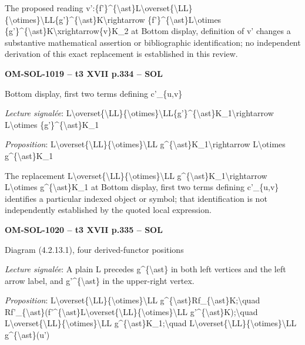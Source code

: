 The proposed reading v':\{f'\}\textasciicircum{}\{\textbackslash{}ast\}L\textbackslash{}overset\{\textbackslash{}LL\}\{\textbackslash{}otimes\}\textbackslash{}LL\{g'\}\textasciicircum{}\{\textbackslash{}ast\}K\textbackslash{}rightarrow \{f'\}\textasciicircum{}\{\textbackslash{}ast\}L\textbackslash{}otimes \{g'\}\textasciicircum{}\{\textbackslash{}ast\}K\textbackslash{}xrightarrow\{v\}K\_2 at Bottom display, definition of v' changes a substantive mathematical assertion or bibliographic identification; no independent derivation of this exact replacement is established in this review.\par
\par\noindent\textbf{OM-SOL-1019 -- t3 XVII p.334 -- SOL}\par
Bottom display, first two terms defining c'\_\{u,v\}\par
\emph{Lecture signalée}: L\textbackslash{}overset\{\textbackslash{}LL\}\{\textbackslash{}otimes\}\textbackslash{}LL\{g'\}\textasciicircum{}\{\textbackslash{}ast\}K\_1\textbackslash{}rightarrow L\textbackslash{}otimes \{g'\}\textasciicircum{}\{\textbackslash{}ast\}K\_1\par
\emph{Proposition}: L\textbackslash{}overset\{\textbackslash{}LL\}\{\textbackslash{}otimes\}\textbackslash{}LL g\textasciicircum{}\{\textbackslash{}ast\}K\_1\textbackslash{}rightarrow L\textbackslash{}otimes g\textasciicircum{}\{\textbackslash{}ast\}K\_1\par
The replacement L\textbackslash{}overset\{\textbackslash{}LL\}\{\textbackslash{}otimes\}\textbackslash{}LL g\textasciicircum{}\{\textbackslash{}ast\}K\_1\textbackslash{}rightarrow L\textbackslash{}otimes g\textasciicircum{}\{\textbackslash{}ast\}K\_1 at Bottom display, first two terms defining c'\_\{u,v\} identifies a particular indexed object or symbol; that identification is not independently established by the quoted local expression.\par
\par\noindent\textbf{OM-SOL-1020 -- t3 XVII p.335 -- SOL}\par
Diagram (4.2.13.1), four derived-functor positions\par
\emph{Lecture signalée}: A plain L precedes g\textasciicircum{}\{\textbackslash{}ast\} in both left vertices and the left arrow label, and g'\textasciicircum{}\{\textbackslash{}ast\} in the upper-right vertex.\par
\emph{Proposition}: L\textbackslash{}overset\{\textbackslash{}LL\}\{\textbackslash{}otimes\}\textbackslash{}LL g\textasciicircum{}\{\textbackslash{}ast\}Rf\_\{\textbackslash{}ast\}K;\textbackslash{}quad Rf'\_\{\textbackslash{}ast\}(f'\textasciicircum{}\{\textbackslash{}ast\}L\textbackslash{}overset\{\textbackslash{}LL\}\{\textbackslash{}otimes\}\textbackslash{}LL g'\textasciicircum{}\{\textbackslash{}ast\}K);\textbackslash{}quad L\textbackslash{}overset\{\textbackslash{}LL\}\{\textbackslash{}otimes\}\textbackslash{}LL g\textasciicircum{}\{\textbackslash{}ast\}K\_1;\textbackslash{}quad L\textbackslash{}overset\{\textbackslash{}LL\}\{\textbackslash{}otimes\}\textbackslash{}LL g\textasciicircum{}\{\textbackslash{}ast\}(u')\par
